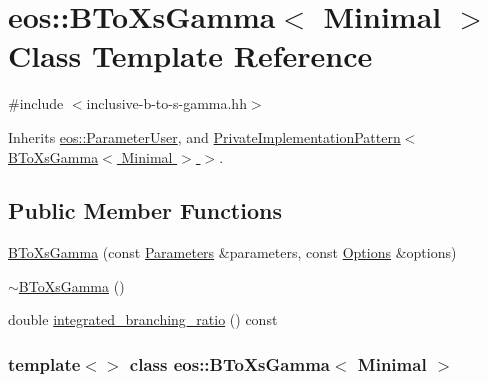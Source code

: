 \hypertarget{classeos_1_1BToXsGamma_3_01Minimal_01_4}{
\section{eos::BToXsGamma$<$ Minimal $>$ Class Template Reference}
\label{classeos_1_1BToXsGamma_3_01Minimal_01_4}
}


{\ttfamily \#include $<$inclusive-\/b-\/to-\/s-\/gamma.hh$>$}

Inherits \hyperlink{classeos_1_1ParameterUser}{eos::ParameterUser}, and \hyperlink{classeos_1_1PrivateImplementationPattern}{PrivateImplementationPattern$<$ BToXsGamma$<$ Minimal $>$ $>$}.\subsection*{Public Member Functions}
\begin{DoxyCompactItemize}
\item 
\hyperlink{classeos_1_1BToXsGamma_3_01Minimal_01_4_abe02af7813b12fb3bcc1909806eba93d}{BToXsGamma} (const \hyperlink{classeos_1_1Parameters}{Parameters} \&parameters, const \hyperlink{classeos_1_1Options}{Options} \&options)
\item 
\hyperlink{classeos_1_1BToXsGamma_3_01Minimal_01_4_a2e995b56bfbd99b8f67dd1f3a17bc984}{$\sim$BToXsGamma} ()
\item 
double \hyperlink{classeos_1_1BToXsGamma_3_01Minimal_01_4_a9356eb8a11e4f54532b3f47d17d16bad}{integrated\_\-branching\_\-ratio} () const 
\end{DoxyCompactItemize}
\subsubsection*{template$<$$>$ class eos::BToXsGamma$<$ Minimal $>$}



